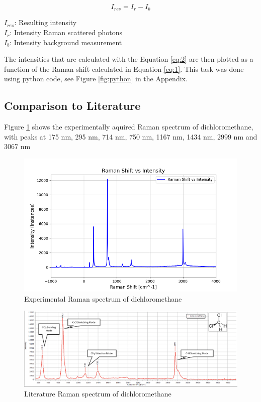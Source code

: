     \begin{equation} \label{eq:2}
        I_{res}=I_r-I_b
    \end{equation}

    \( I_{res}\): Resulting intensity\\
    \(I_r\): Intensity Raman scattered photons\\
    \(I_b\): Intensity background measurement

    \bigskip

    The intensities that are calculated with the Equation \ref{eq:2} are then plotted as a function of the Raman shift calculated in Equation \ref{eq:1}. This task was done using python code, see Figure \ref{fig:python} in the Appendix.

\subsection{Comparison to Literature}

    Figure \ref{fig:dcm_x} shows the experimentally aquired Raman spectrum of dichloromethane, with peaks at 175 nm, 295 nm, 714 nm, 750 nm, 1167 nm, 1434 nm, 2999 nm and 3067 nm 

    \newpage

    \begin{figure}[h]
        \centering
        \includegraphics[width=\textwidth]{images/raman_spectra/raman_shift_DCM.png}
        \caption{Experimental Raman spectrum of dichloromethane}
        \label{fig:dcm_x}
    \end{figure}

    \begin{figure}[h]
        \includegraphics[width=\textwidth]{images/lit_raman/dichloromethane.png}
        \caption{Literature Raman spectrum of dichloromethane \cite{spectrumdcm}}
        \label{fig:dcm_l}
    \end{figure}

